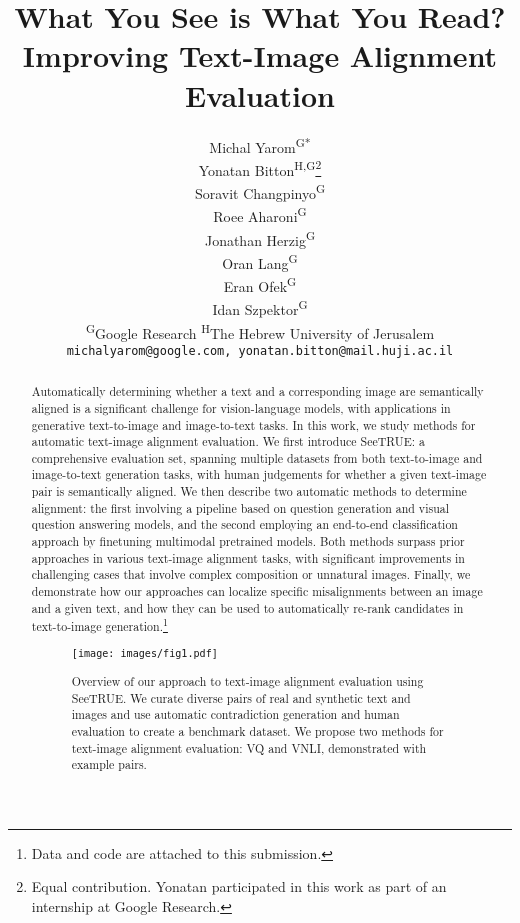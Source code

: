 \documentclass{article}
\title{What You See is What You Read? \\ Improving Text-Image Alignment Evaluation}
\author{Michal Yarom\textsuperscript{G*} \\
  \And
  Yonatan Bitton\textsuperscript{H,G}\thanks{Equal contribution. Yonatan participated in this work as part of an internship at Google Research.} \\
  \And
  Soravit Changpinyo\textsuperscript{G} \\
  \And
  Roee Aharoni\textsuperscript{G} \\
  \And
  Jonathan Herzig\textsuperscript{G} \\
  \And
  Oran Lang\textsuperscript{G} \\
  \And
  Eran Ofek\textsuperscript{G} \\
  \And
  Idan Szpektor\textsuperscript{G}
  \And
  \vspace{-10pt}
  \\
  \textsuperscript{G}Google Research \hspace{20px} \textsuperscript{H}The Hebrew University of Jerusalem\\
  \texttt{michalyarom@google.com, yonatan.bitton@mail.huji.ac.il}
  \\
}
\newcommand{\draftcomment}[3]{{\textcolor{#3}{[#1]#2}}}
\renewcommand{\draftcomment}[3]{}
\newcommand{\yonatan}[1]{\draftcomment{#1}{\textsc{yonatan}}{blue}}
\newcommand{\datasetname}[0]{SeeTRUE\xspace}
\begin{document}
\maketitle

\begin{abstract}
\setcounter{footnote}{0}
\yonatan{Take a look at the ensemble scores at Table 2}Automatically determining whether a text and a corresponding image are semantically aligned is a significant challenge for vision-language models, with applications in generative text-to-image and image-to-text tasks. In this work, we study methods for automatic text-image alignment evaluation. We first introduce \datasetname: a comprehensive evaluation set, spanning multiple datasets from both text-to-image and image-to-text generation tasks, with human judgements for whether a given text-image pair is semantically aligned. We then describe two automatic methods to determine alignment: the first involving a pipeline based on question generation and visual question answering models, and the second employing an end-to-end classification approach by finetuning multimodal pretrained models. Both methods surpass prior approaches in various text-image alignment tasks, with significant improvements in challenging cases that involve complex composition or unnatural images. Finally, we demonstrate how our approaches can localize specific misalignments between an image and a given text, and how they can be used to automatically re-rank candidates in text-to-image generation.\footnote{Data and code are attached to this submission.}%
 \begin{figure}[!h]
    \centering
    \texttt{[image: images/fig1.pdf]}\\
    \caption{Overview of our approach to text-image alignment evaluation using \datasetname. We curate diverse pairs of real and synthetic text and images and use automatic contradiction generation and human evaluation to create a benchmark dataset. We propose two methods for text-image alignment evaluation: VQ and VNLI, demonstrated with example pairs. 
    }
    \label{fig:fig1}
\end{figure} \end{abstract}
\end{document}
